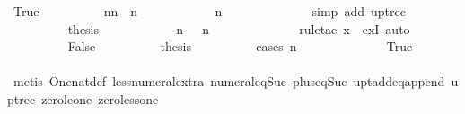 \begin{isabellebody}
\ True\isanewline
\ \ \ \ \ \ \ \ \isamarkupfalse%
\ {\isachardoublequoteopen}{\isacharbrackleft}n{\isacharminus}{}{\isachardot}{\isachardot}{\isacharless}n{\isacharbrackright}\ {\isacharequal}\ {\isacharbrackleft}n{\isacharminus}{}{\isacharbrackright}{\isachardoublequoteclose}\isanewline
\ \ \ \ \ \ \ \ \ \ \isamarkupfalse%
\ {\isacharbackquoteopen}n\ {\isasymge}\ {}{\isacharbackquoteclose}\isanewline
\ \ \ \ \ \ \ \ \ \ \isamarkupfalse%
\ {\isacharparenleft}simp\ add{\isacharcolon}\ upt{\isacharunderscore}rec{\isacharparenright}\isanewline
\ \ \ \ \ \ \ \ \isamarkupfalse%
\ {\isacharquery}thesis\isanewline
\ \ \ \ \ \ \ \ \ \ \isamarkupfalse%
\ {\isacharbackquoteopen}n\ {\isasymge}\ {}{\isacharbackquoteclose}\ {\isacharbackquoteopen}n\ {\isacharless}\ {}{}{}{}{\isacharbackquoteclose}\isanewline
\ \ \ \ \ \ \ \ \ \ \isamarkupfalse%
\ {\isacharparenleft}rule{\isacharunderscore}tac\ x{\isacharequal}{}\ \ exI{\isacharcomma}\ auto{\isacharparenright}\isanewline
\ \ \ \ \ \ \isamarkupfalse%
\isanewline
\ \ \ \ \ \ \ \ \isamarkupfalse%
\ False\isanewline
\ \ \ \ \ \ \ \ \isamarkupfalse%
\ {\isacharquery}thesis\isanewline
\ \ \ \ \ \ \ \ \isamarkupfalse%
\ {\isacharparenleft}cases\ {\isachardoublequoteopen}n\ {\isacharequal}\ {}{}{}{}{\isachardoublequoteclose}{\isacharparenright}\isanewline
\ \ \ \ \ \ \ \ \ \ \isamarkupfalse%
\ True\isanewline
\ \ \ \ \ \ \ \ \ \ \isamarkupfalse%
\ {\isachardoublequoteopen}{\isacharbrackleft}{}{\isachardot}{\isachardot}{\isacharless}{}{}{}{}{\isacharbrackright}\ {\isacharequal}\ {\isacharbrackleft}{}{\isacharbrackright}\ {\isacharat}\ {\isacharbrackleft}{}{\isachardot}{\isachardot}{\isacharless}{}{}{}{}{\isacharbrackright}{\isachardoublequoteclose}\isanewline
\ \ \ \ \ \ \ \ \ \ \ \ \isamarkupfalse%
\ {\isacharparenleft}metis\ One{\isacharunderscore}nat{\isacharunderscore}def\ less{\isacharunderscore}numeral{\isacharunderscore}extra{\isacharparenleft}{}{\isacharparenright}\ numeral{\isacharunderscore}eq{\isacharunderscore}Suc\ plus{\isacharunderscore}{}{\isacharunderscore}eq{\isacharunderscore}Suc\ upt{\isacharunderscore}add{\isacharunderscore}eq{\isacharunderscore}append\ upt{\isacharunderscore}rec\ zero{\isacharunderscore}le{\isacharunderscore}one\ zero{\isacharunderscore}less{\isacharunderscore}one{\isacharparenright}\isanewline

\end{isabellebody}
